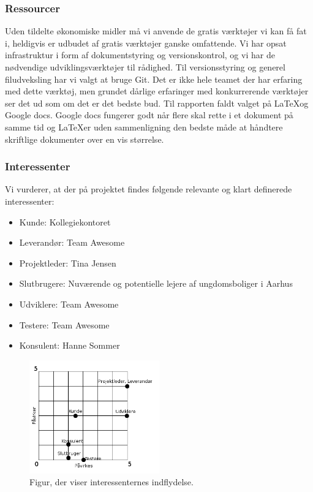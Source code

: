 \documentclass[12pt, a4paper]{report}
\begin{document}
\subsubsection{Ressourcer}
Uden tildelte økonomiske midler må vi anvende de gratis værktøjer vi kan få fat i, heldigvis er udbudet af gratis værktøjer ganske omfattende. Vi har opsat infrastruktur i form af dokumentstyring og versionskontrol, og vi har de nødvendige udviklingsværktøjer til rådighed.
Til versionsstyring og generel filudveksling har vi valgt at bruge Git. Det er ikke hele teamet der har erfaring med dette værktøj, men grundet dårlige erfaringer med konkurrerende værktøjer ser det ud som om det er det bedste bud.
Til rapporten faldt valget på \LaTeX og Google docs. Google docs fungerer godt når flere skal rette i et dokument på samme tid og \LaTeX er uden sammenligning den bedste måde at håndtere skriftlige dokumenter over en vis størrelse.

\subsubsection{Interessenter}
Vi vurderer, at der på projektet findes følgende relevante og klart definerede interessenter:
\begin{itemize}
\item Kunde: Kollegiekontoret
\item Leverandør: Team Awesome
\item Projektleder: Tina Jensen
\item Slutbrugere: Nuværende og potentielle lejere af ungdomsboliger i Aarhus
\item Udviklere: Team Awesome
\item Testere: Team Awesome
\item Konsulent: Hanne Sommer
\end{itemize}

\begin{figure}[ht!]
\includegraphics[width=0.5\textwidth]{interessenter}
\caption{Figur, der viser interessenternes indflydelse.}
\end{figure}
\end{document}
